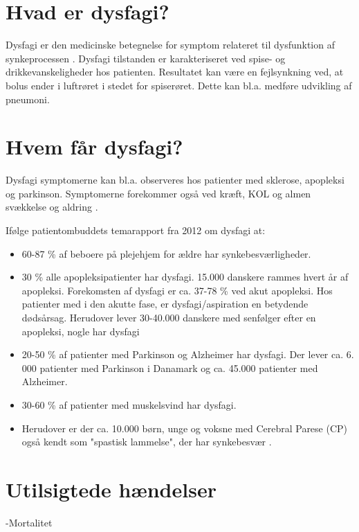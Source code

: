 \documentclass[main.tex]{subfiles}
\begin{document}
\section*{Hvad er dysfagi?}
Dysfagi er den medicinske betegnelse for symptom relateret til dysfunktion af synkeprocessen \cite{KjaersgaardPh.d.studerendeDYSFAGIKonsekvenser}. Dysfagi tilstanden er karakteriseret ved spise- og drikkevanskeligheder hos patienten. Resultatet kan være en fejlsynkning ved, at bolus ender i luftrøret i stedet for spiserøret. Dette kan bl.a. medføre udvikling af pneumoni.
\section*{Hvem får dysfagi?}

 Dysfagi symptomerne kan bl.a. observeres hos patienter med sklerose, apopleksi og parkinson.   Symptomerne forekommer også ved kræft, KOL og almen svækkelse og aldring \cite{SallyRefsgaardTinesterbyKristensen2015DysfagiKommune}. 

Ifølge patientombuddets temarapport fra 2012 om dysfagi at:

\begin{itemize}
\item 60-87 \% af beboere på plejehjem for ældre har synkebesværligheder.
\item 30 \% alle apopleksipatienter har dysfagi. 15.000 danskere rammes hvert år af apopleksi. Forekomsten af dysfagi er ca. 37-78 \% ved akut apopleksi. Hos patienter med i den akutte fase, er dysfagi/aspiration en betydende dødsårsag. Herudover lever 30-40.000 danskere med senfølger efter en apopleksi, nogle har dysfagi
\item 20-50 \% af patienter med Parkinson og Alzheimer har dysfagi. Der lever ca. 6. 000 patienter med Parkinson i Danamark og ca. 45.000 patienter med Alzheimer.  
\item 30-60 \% af patienter med muskelsvind har dysfagi.
\item Herudover er der ca. 10.000 børn, unge og voksne med Cerebral Parese (CP) også kendt som "spastisk lammelse", der har synkebesvær \cite{Bommersholdt2012TemarapportDysfagi}. 
\end{itemize}

\section*{Utilsigtede hændelser}
-Mortalitet
\end{document}

